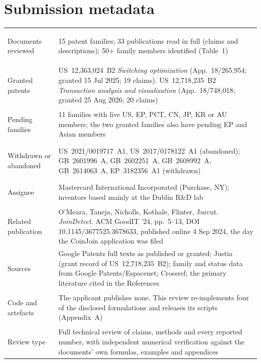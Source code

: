 \documentclass[10pt,a4paper]{article}
\begin{document}
\section*{Submission metadata}
\renewcommand{\arraystretch}{1.12}
\begin{tabularx}{\textwidth}{>{\bfseries\raggedright\arraybackslash}p{4.3cm}X}
\toprule
Documents reviewed & 15 patent families; 33 publications read in full (claims and descriptions); 50+ family members identified (Table~1) \\
Granted patents & US~12,363,024~B2 \emph{Switching optimization} (App.\ 18/265,954; granted 15 Jul 2025; 19 claims). US~12,718,235~B2 \emph{Transaction analysis and visualisation} (App.\ 18/748,018; granted 25 Aug 2026; 20 claims) \\
Pending families & 11 families with live US, EP, PCT, CN, JP, KR or AU members; the two granted families also have pending EP and Asian members \\
Withdrawn or abandoned & US~2021/0019717~A1, US~2017/0178122~A1 (abandoned); GB~2601996~A, GB~2602251~A, GB~2608992~A, GB~2614063~A, EP~3182356~A1 (withdrawn) \\
Assignee & Mastercard International Incorporated (Purchase, NY); inventors based mainly at the Dublin R\&D lab \\
Related publication & O'Meara, Taneja, Nicholls, Kothale, Flinter, Jurcut. \emph{JoinDetect}. ACM GoodIT '24, pp.~5--13, DOI 10.1145/3677525.3678633, published online 4 Sep 2024, the day the CoinJoin application was filed \\
Sources & Google Patents full texts as published or granted; Justia (grant record of US~12,718,235~B2); family and status data from Google Patents/Espacenet; Crossref; the primary literature cited in the References \\
Code and artefacts & The applicant publishes none. This review re-implements four of the disclosed formulations and releases its scripts (Appendix~A) \\
Review type & Full technical review of claims, methods and every reported number, with independent numerical verification against the documents' own formulas, examples and appendices \\
\bottomrule
\end{tabularx}
\end{document}
